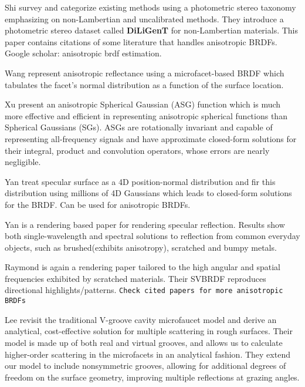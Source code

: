 Shi \etal \cite{shi2016benchmark} survey and categorize existing methods using a photometric stereo taxonomy emphasizing on non-Lambertian and uncalibrated methods. They introduce a photometric stereo dataset called \textbf{DiLiGenT} for non-Lambertian materials. This paper contains citations of some literature that handles anisotropic BRDFs. Google scholar: anisotropic brdf estimation.

\dagg Wang \etal \cite{wang2008modeling} represent anisotropic reflectance using a microfacet-based BRDF which tabulates the facet's normal distribution as a function of the surface location. 

\dagg Xu \etal \cite{xu2013anisotropic} present an anisotropic Spherical Gaussian (ASG) function which is much more effective and efficient in representing anisotropic spherical functions than Spherical Gaussians (SGs). ASGs are rotationally invariant and capable of representing all-frequency signals and have approximate closed-form solutions for their integral, product and convolution operators, whose errors are nearly negligible.

\dagg Yan \etal \cite{yan2016position} treat specular surface as a 4D position-normal distribution and fir this distribution using millions of 4D Gaussians which leads to closed-form solutions for the BRDF. Can be used for anisotropic BRDFs.

\dagg Yan \etal \cite{yan2018rendering} is a rendering based paper for rendering specular reflection. Results show both single-wavelength and spectral solutions to reflection from common everyday objects, such as brushed(exhibits anisotropy), scratched and bumpy metals.

\dagg Raymond \etal \cite{raymond2016multi} is again a rendering paper tailored to the high angular and spatial frequencies exhibited by scratched materials. Their SVBRDF reproduces directional highlights/patterns. \texttt{Check cited papers for more anisotropic BRDFs}

\dagg Lee \etal \cite{lee2018practical} revisit the traditional V-groove cavity microfaucet model and derive an analytical, cost-effective solution for multiple scattering in rough surfaces. Their model is made up of both real and virtual grooves, and allows us to calculate higher-order scattering in the microfacets
in an analytical fashion. They extend our model to include nonsymmetric grooves, allowing for additional degrees of freedom on the surface geometry, improving multiple reflections at grazing angles.

